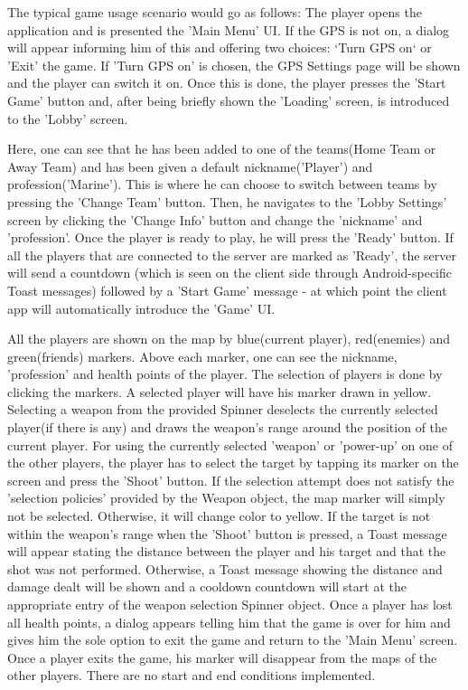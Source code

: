 The typical game usage scenario would go as follows: The player opens the
application and is presented the 'Main Menu' UI. If the GPS is not on, a dialog
will appear informing him of this and offering two choices: `Turn GPS on` or
'Exit' the game. If 'Turn GPS on' is chosen, the GPS Settings page will be shown
and the player can switch it on. Once this is done, the player presses the 
'Start Game' button and, after being briefly shown the 'Loading' screen, is
introduced to the 'Lobby' screen.\newline

Here, one can see that he has been added to one of the teams(Home Team or Away
Team) and has been given a default nickname('Player') and profession('Marine').
This is where he can choose to switch between teams by pressing the 'Change
Team' button. Then, he navigates to the 'Lobby Settings' screen by clicking the
'Change Info' button and change the 'nickname' and 'profession'. Once the player
is ready to play, he will press the 'Ready' button. If all the players that are
connected to the server are marked as 'Ready', the server will send a countdown
(which is seen on the client side through Android-specific Toast messages)
followed by a 'Start Game' message - at which point the client app will
automatically introduce the 'Game' UI. \newline

All the players are shown on the map by blue(current player), red(enemies) and
green(friends) markers. Above each marker, one can see the nickname,
'profession' and health points of the player. The selection of players is done
by clicking the markers. A selected player will have his marker drawn in yellow.
Selecting a weapon from the provided Spinner deselects the currently selected
player(if there is any) and draws the weapon's range around the position of the
current player. For using the currently selected 'weapon' or 'power-up' on one
of the other players, the player has to select the target by tapping its marker on
the screen and press the 'Shoot' button. If the selection attempt does not
satisfy the 'selection policies' provided by the Weapon object, the map marker
will simply not be selected. Otherwise, it will change color to yellow. If the
target is not within the weapon's range when the 'Shoot' button is pressed, a
Toast message will appear stating the distance between the player and his target
and that the shot was not performed. Otherwise, a Toast message showing the
distance and damage dealt will be shown and a cooldown countdown will start at
the appropriate entry of the weapon selection Spinner object. Once a player has
lost all health points, a dialog appears telling him that the game is over for
him and gives him the sole option to exit the game and return to the 'Main
Menu' screen. Once a player exits the game, his marker will disappear from the
maps of the other players. There are no start and end conditions implemented.

